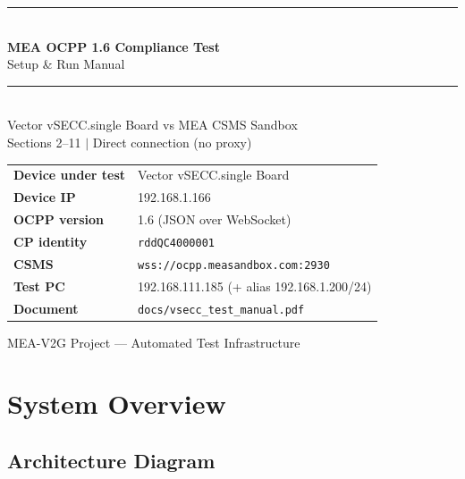 \documentclass[11pt, a4paper]{article}
\begin{document}
\begin{titlepage}
  \centering
  \vspace*{2cm}
  {\color{mea-blue}\rule{\linewidth}{2pt}}\\[0.6em]
  {\Huge\bfseries MEA OCPP 1.6 Compliance Test}\\[0.4em]
  {\LARGE Setup \& Run Manual}\\[0.4em]
  {\color{mea-blue}\rule{\linewidth}{2pt}}\\[2em]
  {\large Vector vSECC.single Board vs MEA CSMS Sandbox}\\[0.5em]
  {\large Sections 2--11 $\mid$ Direct connection (no proxy)}\\[3em]
  \begin{tabular}{ll}
    \textbf{Device under test} & Vector vSECC.single Board \\
    \textbf{Device IP}         & 192.168.1.166 \\
    \textbf{OCPP version}      & 1.6 (JSON over WebSocket) \\
    \textbf{CP identity}       & \texttt{rddQC4000001} \\
    \textbf{CSMS}              & \texttt{wss://ocpp.measandbox.com:2930} \\
    \textbf{Test PC}           & 192.168.111.185 (+ alias 192.168.1.200/24) \\
    \textbf{Document}          & \texttt{docs/vsecc\_test\_manual.pdf} \\
  \end{tabular}
  \vfill
  {\small MEA-V2G Project --- Automated Test Infrastructure}
\end{titlepage}

\tableofcontents
\newpage

\section{System Overview}

\subsection{Architecture Diagram}
\end{document}
